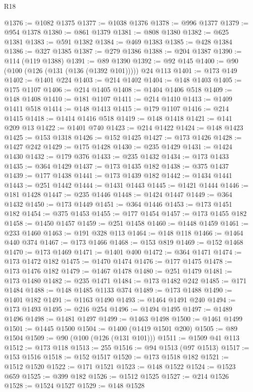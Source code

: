 \begin{lexlean}{R18}
\begin{coremodule}
@1376 := @1082 @1375
@1377 := @1038 @1376
@1378 := @996 @1377
@1379 := @954 @1378
@1380 := @861 @1379
@1381 := @808 @1380
@1382 := @625 @1381
@1383 := @591 @1382
@1384 := @469 @1383
@1385 := @428 @1384
@1386 := @327 @1385
@1387 := @279 @1386
@1388 := @204 @1387
@1390 := @114 (@119 @1388)
@1391 := @89 @1390
@1392 := @92 @145
@1400 := @90 (@100 (@126 (@131 (@136 (@1392 @101))))) @24 @113
@1401 := @173 @149
@1402 := @1401 @224
@1403 := @214 @1402
@1404 := @148 @1403
@1405 := @175 @1107
@1406 := @214 @1405
@1408 := @1404 @1406 @518
@1409 := @148 @1408
@1410 := @181 @1107
@1411 := @214 @1410
@1413 := @1409 @1411 @518
@1414 := @148 @1413
@1415 := @179 @1107
@1416 := @214 @1415
@1418 := @1414 @1416 @518
@1419 := @148 @1418
@1421 := @141 @209 @13
@1422 := @1401 @740
@1423 := @214 @1422
@1424 := @148 @1423
@1425 := @153 @1318
@1426 := @152 @1425
@1427 := @173 @1426
@1428 := @1427 @242
@1429 := @175 @1428
@1430 := @235 @1429
@1431 := @1424 @1430
@1432 := @179 @376
@1433 := @235 @1432
@1434 := @173 @1433
@1435 := @364 @1429
@1437 := @173 @1435 @182
@1438 := @375 @1437
@1439 := @177 @1438
@1441 := @173 @1439 @182
@1442 := @1434 @1441
@1443 := @251 @1442
@1444 := @1431 @1443
@1445 := @1421 @1444
@1446 := @181 @1428
@1447 := @235 @1446
@1448 := @1424 @1447
@1449 := @364 @1432
@1450 := @173 @1449
@1451 := @364 @1446
@1453 := @173 @1451 @182
@1454 := @375 @1453
@1455 := @177 @1454
@1457 := @173 @1455 @182
@1458 := @1450 @1457
@1459 := @251 @1458
@1460 := @1448 @1459
@1461 := @233 @1460
@1463 := @191 @328 @113
@1464 := @148 @118
@1466 := @1464 @440 @374
@1467 := @173 @1466
@1468 := @153 @819
@1469 := @152 @1468
@1470 := @173 @1469
@1471 := @1401 @400
@1472 := @364 @1471
@1474 := @173 @1472 @182
@1475 := @1470 @1474
@1476 := @177 @1475
@1478 := @173 @1476 @182
@1479 := @1467 @1478
@1480 := @251 @1479
@1481 := @173 @1480
@1482 := @235 @1471
@1484 := @173 @1482 @242
@1485 := @171 @1484
@1488 := @148 @1485 @1133 @374
@1489 := @173 @1488
@1490 := @1401 @182
@1491 := @1163 @1490
@1493 := @1464 @1491 @240
@1494 := @173 @1493
@1495 := @216 @254
@1496 := @1494 @1495
@1497 := @1489 @1496
@1498 := @1481 @1497
@1499 := @1463 @1498
@1500 := @1461 @1499
@1501 := @1445 @1500
@1504 := @1400 (@1419 @1501 @200)
@1505 := @89 @1504
@1509 := @90 (@100 (@126 (@131 @101)))
@1511 := @1509 @41 @113
@1512 := @173 @118
@1513 := 255
@1516 := @94 @1513 (@97 @1513)
@1517 := @153 @1516
@1518 := @152 @1517
@1520 := @173 @1518 @182
@1521 := @1512 @1520
@1522 := @171 @1521
@1523 := @148 @1522
@1524 := @1523 @659
@1525 := @399 @182
@1526 := @1512 @1525
@1527 := @214 @1526
@1528 := @1524 @1527
@1529 := @148 @1528

\end{coremodule}
\end{lexlean}
